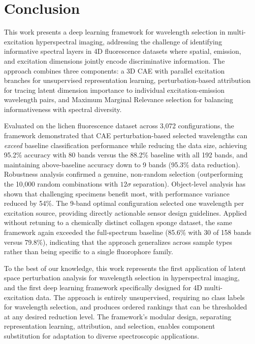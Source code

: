 \section{Conclusion}
\label{sec:conclusion}

This work presents a deep learning framework for wavelength selection in multi-excitation hyperspectral imaging, addressing the challenge of identifying informative spectral layers in 4D fluorescence datasets where spatial, emission, and excitation dimensions jointly encode discriminative information.
The approach combines three components: a 3D CAE with parallel excitation branches for unsupervised representation learning, perturbation-based attribution for tracing latent dimension importance to individual excitation-emission wavelength pairs, and Maximum Marginal Relevance selection for balancing informativeness with spectral diversity.

Evaluated on the lichen fluorescence dataset across 3,072 configurations, the framework demonstrated that CAE perturbation-based selected wavelengths can \emph{exceed} baseline classification performance while reducing the data size, achieving 95.2\% accuracy with 80 bands versus the 88.2\% baseline with all 192 bands, and maintaining above-baseline accuracy down to 9 bands (95.3\% data reduction).
Robustness analysis confirmed a genuine, non-random selection (outperforming the 10,000 random combinations with $12\sigma$ separation). Object-level analysis has shown that challenging specimens benefit most, with performance variance reduced by 54\%.
The 9-band optimal configuration selected one wavelength per excitation source, providing directly actionable sensor design guidelines.
Applied without retuning to a chemically distinct collagen sponge dataset, the same framework again exceeded the full-spectrum baseline (85.6\% with 30 of 158 bands versus 79.8\%), indicating that the approach generalizes across sample types rather than being specific to a single fluorophore family.

To the best of our knowledge, this work represents the first application of latent space perturbation analysis for wavelength selection in hyperspectral imaging, and the first deep learning framework specifically designed for 4D multi-excitation data.
The approach is entirely unsupervised, requiring no class labels for wavelength selection, and produces ordered rankings that can be thresholded at any desired reduction level.
The framework's modular design, separating representation learning, attribution, and selection, enables component substitution for adaptation to diverse spectroscopic applications.

